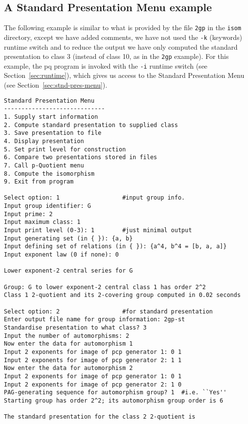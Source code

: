 \documentclass[12pt]{article}
\begin{document}
\subsection{A Standard Presentation Menu example}

The following example is similar to what is provided by the file \verb|2gp|
in the \texttt{isom} directory, except we have added comments, we
have not used the \texttt{-k} (keywords) runtime switch and to reduce the
output we have only computed the standard presentation to class 3 (instead
of class 10, as in the \verb|2gp| example).
For this example, the pq program is invoked with the \texttt{-i} runtime
switch (see Section~\ref{sec:runtime}), which gives us access to the
Standard Presentation Menu (see Section~\ref{sec:stnd-pres-menu}).

\begin{verbatim}
Standard Presentation Menu
-----------------------------
1. Supply start information
2. Compute standard presentation to supplied class
3. Save presentation to file
4. Display presentation
5. Set print level for construction
6. Compare two presentations stored in files
7. Call p-Quotient menu
8. Compute the isomorphism
9. Exit from program

Select option: 1                  #input group info.
Input group identifier: G
Input prime: 2
Input maximum class: 1
Input print level (0-3): 1        #just minimal output
Input generating set (in { }): {a, b}
Input defining set of relations (in { }): {a^4, b^4 = [b, a, a]}
Input exponent law (0 if none): 0

Lower exponent-2 central series for G

Group: G to lower exponent-2 central class 1 has order 2^2
Class 1 2-quotient and its 2-covering group computed in 0.02 seconds

Select option: 2                  #for standard presentation
Enter output file name for group information: 2gp-st
Standardise presentation to what class? 3
Input the number of automorphisms: 2
Now enter the data for automorphism 1
Input 2 exponents for image of pcp generator 1: 0 1
Input 2 exponents for image of pcp generator 2: 1 1
Now enter the data for automorphism 2
Input 2 exponents for image of pcp generator 1: 0 1
Input 2 exponents for image of pcp generator 2: 1 0
PAG-generating sequence for automorphism group? 1  #i.e. ``Yes''
Starting group has order 2^2; its automorphism group order is 6 

The standard presentation for the class 2 2-quotient is


\end{verbatim}
\end{document}
